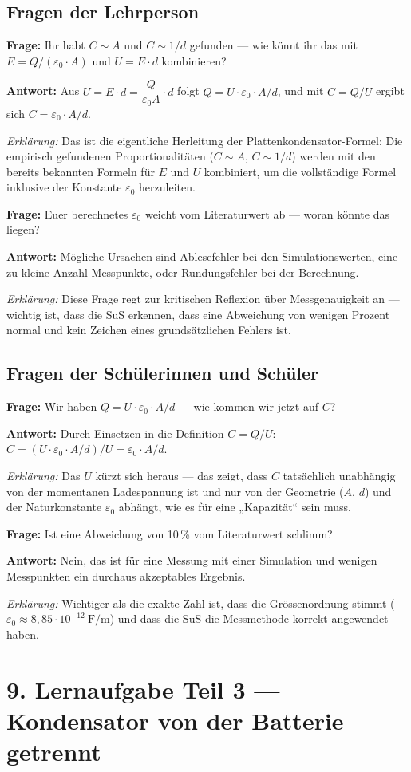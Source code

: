 \documentclass[11pt,a4paper]{article}
\newcommand{\Frage}[1]{\textbf{Frage:} #1\par}
\newcommand{\Antwort}[1]{\textbf{Antwort:} #1\par}
\newcommand{\Erklaerung}[1]{\textit{Erklärung:} #1}
\newcommand{\FrageBlock}[3]{\Frage{#1}\Antwort{#2}\Erklaerung{#3}\vspace{0.6em}}
\begin{document}
\subsection*{Fragen der Lehrperson}

\FrageBlock{Ihr habt $C\sim A$ und $C\sim 1/d$ gefunden --- wie könnt ihr das mit $E=Q/(\varepsilon_0\cdot A)$ und $U=E\cdot d$ kombinieren?}
{Aus $U=E\cdot d=\dfrac{Q}{\varepsilon_0 A}\cdot d$ folgt $Q=U\cdot\varepsilon_0\cdot A/d$, und mit $C=Q/U$ ergibt sich $C=\varepsilon_0\cdot A/d$.}
{Das ist die eigentliche Herleitung der Plattenkondensator-Formel: Die empirisch gefundenen Proportionalitäten ($C\sim A$, $C\sim 1/d$) werden mit den bereits bekannten Formeln für $E$ und $U$ kombiniert, um die vollständige Formel inklusive der Konstante $\varepsilon_0$ herzuleiten.}

\FrageBlock{Euer berechnetes $\varepsilon_0$ weicht vom Literaturwert ab --- woran könnte das liegen?}
{Mögliche Ursachen sind Ablesefehler bei den Simulationswerten, eine zu kleine Anzahl Messpunkte, oder Rundungsfehler bei der Berechnung.}
{Diese Frage regt zur kritischen Reflexion über Messgenauigkeit an --- wichtig ist, dass die SuS erkennen, dass eine Abweichung von wenigen Prozent normal und kein Zeichen eines grundsätzlichen Fehlers ist.}

\subsection*{Fragen der Schülerinnen und Schüler}

\FrageBlock{Wir haben $Q=U\cdot\varepsilon_0\cdot A/d$ --- wie kommen wir jetzt auf $C$?}
{Durch Einsetzen in die Definition $C=Q/U$: $C=(U\cdot\varepsilon_0\cdot A/d)/U=\varepsilon_0\cdot A/d$.}
{Das $U$ kürzt sich heraus --- das zeigt, dass $C$ tatsächlich unabhängig von der momentanen Ladespannung ist und nur von der Geometrie ($A$, $d$) und der Naturkonstante $\varepsilon_0$ abhängt, wie es für eine „Kapazität“ sein muss.}

\FrageBlock{Ist eine Abweichung von 10\,\% vom Literaturwert schlimm?}
{Nein, das ist für eine Messung mit einer Simulation und wenigen Messpunkten ein durchaus akzeptables Ergebnis.}
{Wichtiger als die exakte Zahl ist, dass die Grössenordnung stimmt ($\varepsilon_0\approx 8{,}85\cdot 10^{-12}\ \mathrm{F/m}$) und dass die SuS die Messmethode korrekt angewendet haben.}

\section*{9. Lernaufgabe Teil 3 --- Kondensator von der Batterie getrennt}
\end{document}
